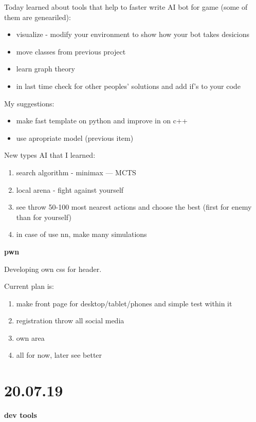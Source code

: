 \documentclass[12pt,a4paper,titlepage]{article}
\begin{document}
Today learned about tools that help to faster write AI bot for game (some of them are geneariled):
\begin{itemize}
    \item visualize - modify your environment to show how your bot takes desi\-cions
    \item move classes from previous project
    \item learn graph theory
    \item in last time check for other peoples' solutions and add if's to your code
\end{itemize}

My suggestions:
\begin{itemize}
    \item make fast template on python and improve in on c++
    \item use apropriate model (previous item)
\end{itemize}

New types AI that I learned:
\begin{enumerate}
    \item search algorithm - minimax --- MCTS
    \item local arena - fight against yourself
    \item see throw 50-100 most nearest actions and choose the best (first for enemy than for yourself)
    \item in case of use nn, make many simulations
\end{enumerate}

\begin{center}
    \large \textbf{pwn}
\end{center}

Developing own css for header.

Current plan is:
\begin{enumerate}
    \item make front page for desktop/tablet/phones and simple test within it
    \item registration throw all social media
    \item own area
    \item all for now, later see better
\end{enumerate}

\newpage
\section{20.07.19}
\begin{center}
    \large \textbf{dev tools}
\end{center}
\end{document}
